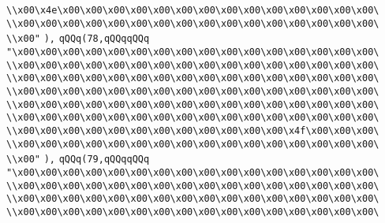 \verb|\\x00\x4e\x00\x00\x00\x00\x00\x00\x00\x00\x00\x00\x00\x00\x00\x00\|\newline
\verb|\\x00\x00\x00\x00\x00\x00\x00\x00\x00\x00\x00\x00\x00\x00\x00\x00\|\newline
\verb|\\x00"|\newline
\verb|),|\newline
\verb|qQQq(78,qQQqqQQq|\newline
\verb|"\x00\x00\x00\x00\x00\x00\x00\x00\x00\x00\x00\x00\x00\x00\x00\x00\|\newline
\verb|\\x00\x00\x00\x00\x00\x00\x00\x00\x00\x00\x00\x00\x00\x00\x00\x00\|\newline
\verb|\\x00\x00\x00\x00\x00\x00\x00\x00\x00\x00\x00\x00\x00\x00\x00\x00\|\newline
\verb|\\x00\x00\x00\x00\x00\x00\x00\x00\x00\x00\x00\x00\x00\x00\x00\x00\|\newline
\verb|\\x00\x00\x00\x00\x00\x00\x00\x00\x00\x00\x00\x00\x00\x00\x00\x00\|\newline
\verb|\\x00\x00\x00\x00\x00\x00\x00\x00\x00\x00\x00\x00\x00\x00\x00\x00\|\newline
\verb|\\x00\x00\x00\x00\x00\x00\x00\x00\x00\x00\x00\x00\x4f\x00\x00\x00\|\newline
\verb|\\x00\x00\x00\x00\x00\x00\x00\x00\x00\x00\x00\x00\x00\x00\x00\x00\|\newline
\verb|\\x00"|\newline
\verb|),|\newline
\verb|qQQq(79,qQQqqQQq|\newline
\verb|"\x00\x00\x00\x00\x00\x00\x00\x00\x00\x00\x00\x00\x00\x00\x00\x00\|\newline
\verb|\\x00\x00\x00\x00\x00\x00\x00\x00\x00\x00\x00\x00\x00\x00\x00\x00\|\newline
\verb|\\x00\x00\x00\x00\x00\x00\x00\x00\x00\x00\x00\x00\x00\x00\x00\x00\|\newline
\verb|\\x00\x00\x00\x00\x00\x00\x00\x00\x00\x00\x00\x00\x00\x00\x00\x00\|\newline
